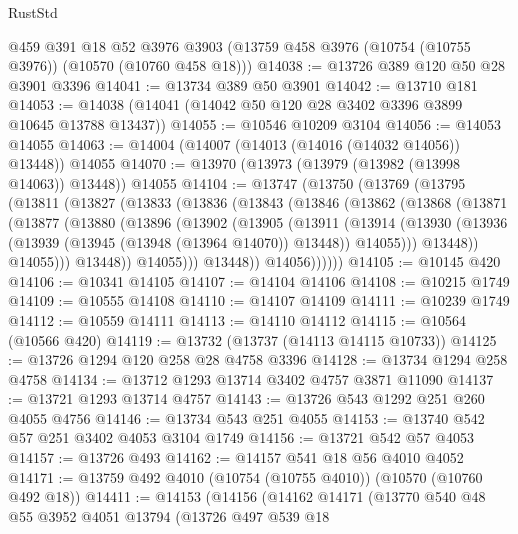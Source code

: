 \begin{lexlean}{RustStd}
\begin{coremodule}
    @459
    @391
    @18
    @52
    @3976
    @3903
    (@13759 @458 @3976 (@10754 (@10755 @3976)) (@10570 (@10760 @458 @18)))
@14038 := @13726 @389 @120 @50 @28 @3901 @3396
@14041 := @13734 @389 @50 @3901
@14042 := @13710 @181
@14053 := @14038 (@14041 (@14042 @50 @120 @28 @3402 @3396 @3899 @10645 @13788 @13437))
@14055 := @10546 @10209 @3104
@14056 := @14053 @14055
@14063 := @14004 (@14007 (@14013 (@14016 (@14032 @14056)) @13448)) @14055
@14070 := @13970 (@13973 (@13979 (@13982 (@13998 @14063)) @13448)) @14055
@14104 := @13747
    (@13750
      (@13769
        (@13795
          (@13811
            (@13827
              (@13833
                (@13836
                  (@13843
                    (@13846
                      (@13862
                        (@13868
                          (@13871
                            (@13877
                              (@13880
                                (@13896
                                  (@13902
                                    (@13905
                                      (@13911
                                        (@13914
                                          (@13930
                                            (@13936
                                              (@13939 (@13945 (@13948 (@13964 @14070)) @13448))
                                              @14055)))
                                        @13448))
                                    @14055)))
                              @13448))
                          @14055)))
                    @13448))
                @14056))))))
@14105 := @10145 @420
@14106 := @10341 @14105
@14107 := @14104 @14106
@14108 := @10215 @1749
@14109 := @10555 @14108
@14110 := @14107 @14109
@14111 := @10239 @1749
@14112 := @10559 @14111
@14113 := @14110 @14112
@14115 := @10564 (@10566 @420)
@14119 := @13732 (@13737 (@14113 @14115 @10733))
@14125 := @13726 @1294 @120 @258 @28 @4758 @3396
@14128 := @13734 @1294 @258 @4758
@14134 := @13712 @1293 @13714 @3402 @4757 @3871 @11090
@14137 := @13721 @1293 @13714 @4757
@14143 := @13726 @543 @1292 @251 @260 @4055 @4756
@14146 := @13734 @543 @251 @4055
@14153 := @13740 @542 @57 @251 @3402 @4053 @3104 @1749
@14156 := @13721 @542 @57 @4053
@14157 := @13726 @493
@14162 := @14157 @541 @18 @56 @4010 @4052
@14171 := @13759 @492 @4010 (@10754 (@10755 @4010)) (@10570 (@10760 @492 @18))
@14411 := @14153
    (@14156
      (@14162
        @14171
        (@13770
          @540
          @48
          @55
          @3952
          @4051
          @13794
          (@13726
            @497
            @539
            @18

\end{coremodule}
\end{lexlean}
